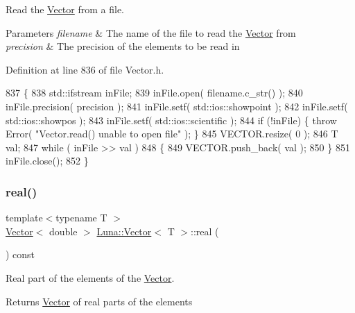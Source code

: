 Read the \hyperlink{classLuna_1_1Vector}{Vector} from a file. 


\begin{DoxyParams}{Parameters}
{\em filename} & The name of the file to read the \hyperlink{classLuna_1_1Vector}{Vector} from \\
\hline
{\em precision} & The precision of the elements to be read in \\
\hline
\end{DoxyParams}


Definition at line 836 of file Vector.\+h.


\begin{DoxyCode}
837   \{
838     std::ifstream inFile;
839         inFile.open( filename.c\_str() );
840         inFile.precision( precision );
841         inFile.setf( std::ios::showpoint );
842         inFile.setf( std::ios::showpos );
843         inFile.setf( std::ios::scientific );
844         \textcolor{keywordflow}{if} (!inFile) \{ \textcolor{keywordflow}{throw} Error( \textcolor{stringliteral}{"Vector.read() unable to open file"} ); \}
845     VECTOR.resize( 0 );
846     T val;
847     \textcolor{keywordflow}{while} ( inFile >> val )
848     \{
849       VECTOR.push\_back( val );
850     \}
851     inFile.close();
852   \}
\end{DoxyCode}
\mbox{\label{classLuna_1_1Vector_a39fa58d9f5fdca76b6ffa6cc481f9284}} 
\subsubsection{\texorpdfstring{real()}{real()}}
{\footnotesize\ttfamily template$<$typename T $>$ \\
\hyperlink{classLuna_1_1Vector}{Vector}$<$ double $>$ \hyperlink{classLuna_1_1Vector}{Luna\+::\+Vector}$<$ T $>$\+::real (\begin{DoxyParamCaption}{ }\end{DoxyParamCaption}) const\hspace{0.3cm}{\ttfamily [inline]}}



Real part of the elements of the \hyperlink{classLuna_1_1Vector}{Vector}. 

\begin{DoxyReturn}{Returns}
\hyperlink{classLuna_1_1Vector}{Vector} of real parts of the elements 
\end{DoxyReturn}


